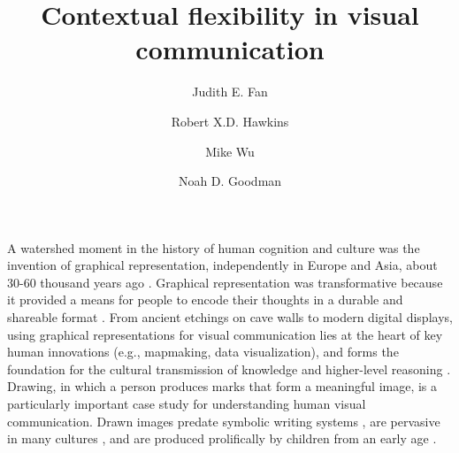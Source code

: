 \documentclass[9pt,twocolumn,twoside]{pnas-new}
\title{Contextual flexibility in visual communication}
\author[a,1]{Judith E. Fan}
\author[a]{Robert X.D. Hawkins}
\author[b]{Mike Wu}
\author[a,b]{Noah D. Goodman}
\affil[a]{Department of Psychology, Stanford University}
\affil[b]{Department of Computer Science, Stanford University}
\begin{document}
\verticaladjustment{-2pt}

\maketitle
\thispagestyle{firststyle}


A watershed moment in the history of human cognition and culture was the invention of graphical representation, independently in Europe and Asia, about 30-60 thousand years ago \cite{hoffmann2018u,Aubert:2014jy}. 
Graphical representation was transformative because it provided a means for people to encode their thoughts in a durable and shareable format \cite{donald1991origins}. 
From ancient etchings on cave walls to modern digital displays, using graphical representations for visual communication lies at the heart of key human innovations (e.g., mapmaking, data visualization), and forms the foundation for the cultural transmission of knowledge and higher-level reasoning \cite{tomasello2009cultural,card1999readings}. 
Drawing, in which a person produces marks that form a meaningful image, is a particularly important case study for understanding human visual communication. Drawn images predate symbolic writing systems \cite{clottes2008cave}, are pervasive in many cultures \cite{gombrich1989story}, and are produced prolifically by children from an early age \cite{kellogg1969analyzing}.
\end{document}
